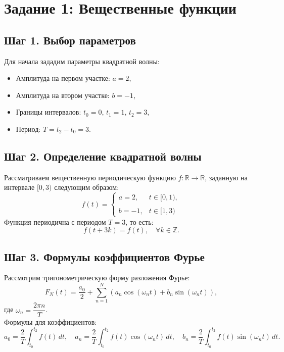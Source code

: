 \section*{Задание 1: Вещественные функции}

\subsection*{Шаг 1. Выбор параметров}

Для начала зададим параметры квадратной волны:
\begin{itemize}
    \item Амплитуда на первом участке: $a = 2$,
    \item Амплитуда на втором участке: $b = -1$,
    \item Границы интервалов: $t_0 = 0$, $t_1 = 1$, $t_2 = 3$,
    \item Период: $T = t_2 - t_0 = 3$.
\end{itemize}

\subsection*{Шаг 2. Определение квадратной волны}

Рассматриваем вещественную периодическую функцию $f: \mathbb{R} \rightarrow \mathbb{R}$, заданную на интервале $[0,3)$ следующим образом:
\[
f(t) =
\begin{cases}
a = 2, & t \in [0,1), \\\\
b = -1, & t \in [1,3)
\end{cases}
\]
Функция периодична с периодом $T = 3$, то есть:
\[
f(t + 3k) = f(t), \quad \forall k \in \mathbb{Z}.
\]

\subsection*{Шаг 3. Формулы коэффициентов Фурье}

Рассмотрим тригонометрическую форму разложения Фурье:
\[
F_N(t) = \frac{a_0}{2} + \sum_{n=1}^N \left( a_n \cos\left( \omega_n t \right) + b_n \sin\left( \omega_n t \right) \right),
\]
где $ \omega_n = \dfrac{2\pi n}{T} $.\\

Формулы для коэффициентов:
\[
a_0 = \frac{2}{T} \int_{t_0}^{t_2} f(t)\,dt,
\quad
a_n = \frac{2}{T} \int_{t_0}^{t_2} f(t)\cos(\omega_n t)\,dt,
\quad
b_n = \frac{2}{T} \int_{t_0}^{t_2} f(t)\sin(\omega_n t)\,dt.
\]


